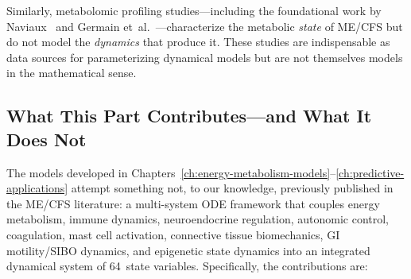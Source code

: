 Similarly, metabolomic profiling studies---including the foundational work by Naviaux~\cite{Naviaux2016metabolomics} and Germain et~al.~\cite{Germain2020metabolic}---characterize the metabolic \emph{state} of ME/CFS but do not model the \emph{dynamics} that produce it. These studies are indispensable as data sources for parameterizing dynamical models but are not themselves models in the mathematical sense.

\subsection{What This Part Contributes---and What It Does Not}
\label{sec:contribution-scope}

The models developed in Chapters~\ref{ch:energy-metabolism-models}--\ref{ch:predictive-applications} attempt something not, to our knowledge, previously published in the ME/CFS literature: a multi-system ODE framework that couples energy metabolism, immune dynamics, neuroendocrine regulation, autonomic control, coagulation, mast cell activation, connective tissue biomechanics, GI motility/SIBO dynamics, and epigenetic state dynamics into an integrated dynamical system of 64~state variables. Specifically, the contributions are:

